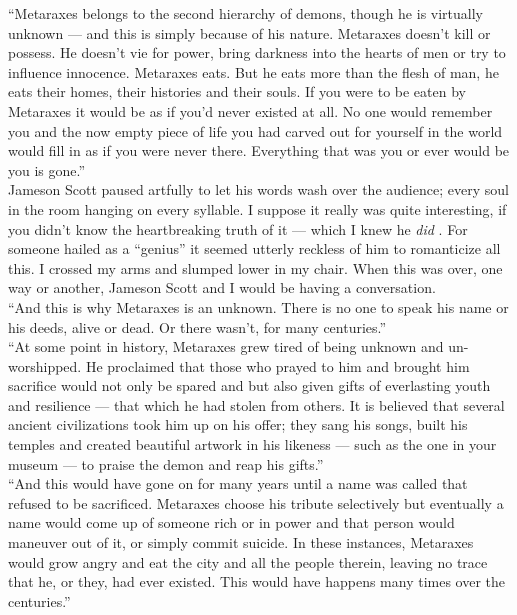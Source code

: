 \documentclass[a5paper]{scrartcl}
\begin{document}
\enquote{Metaraxes  belongs to the second hierarchy of demons, though he is virtually unknown --- and this is simply because of his nature. Metaraxes doesn't kill or possess. He doesn't vie for power, bring darkness into the hearts of men or try to influence innocence.  Metaraxes eats. But he eats more than the flesh of man, he eats their homes, their histories and their souls. If you were to be eaten by Metaraxes it would be as if you'd never existed at all. No one would remember you and the now empty piece of life you had carved out for yourself in the world would fill in as if you were never there. Everything that was you or ever would be you is gone.}\\


Jameson Scott paused artfully to let his words wash over the audience; every soul in the room hanging on every syllable. I suppose it really was quite interesting, if you didn't know the heartbreaking truth of it --- which I knew he \textit{did}
. For someone hailed as a \enquote{genius} it seemed utterly reckless of him to romanticize all this.  I crossed my arms and slumped lower in my chair. When this was over, one way or another, Jameson Scott and I would be having a conversation. \\


\enquote{And this is why Metaraxes is an unknown. There is no one to speak his name or his deeds, alive or dead. Or there wasn't, for many centuries.}\\


\enquote{At some point in history, Metaraxes grew tired of being unknown and un-worshipped. He proclaimed that those who prayed to him and brought him sacrifice would not only be spared and but also given gifts of everlasting youth and resilience --- that which he had stolen from others. It is believed that several ancient civilizations took him up on his offer; they sang his songs, built his temples and created beautiful artwork in his likeness --- such as the one in your museum --- to praise the demon and reap his gifts.}\\


\enquote{And this would have gone on for many years until a name was called that refused to be sacrificed. Metaraxes choose his tribute selectively but eventually a name would come up of someone rich or in power and that person would maneuver out of it, or simply commit suicide. In these instances, Metaraxes would grow angry and eat the city and all the people therein, leaving no trace that he, or they, had ever existed. This would have happens many times over the centuries.}\\
\end{document}
